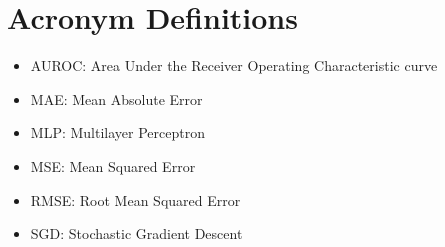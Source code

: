 \documentclass[conference]{IEEEtran}
\begin{document}



\section*{Acronym Definitions}
\begin{itemize}
\item AUROC: Area Under the Receiver Operating Characteristic curve
\item MAE: Mean Absolute Error
\item MLP: Multilayer Perceptron
\item MSE: Mean Squared Error
\item RMSE: Root Mean Squared Error
\item SGD: Stochastic Gradient Descent
\end{itemize}
\end{document}
